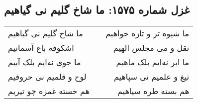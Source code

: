 \begin{center}
\section*{غزل شماره ۱۵۷۵: ما شاخ گلیم نی گیاهیم}
\label{sec:1575}
\begin{longtable}{l p{0.5cm} r}
ما شاخ گلیم نی گیاهیم
&&
ما شیوه تر و تازه خواهیم
\\
اشکوفه باغ آسمانیم
&&
نقل و می مجلس الهیم
\\
ما جوی نه‌ایم بلک آبیم
&&
ما ابر نه‌ایم بلک ماهیم
\\
لوح و قلمیم نی حروفیم
&&
تیغ و علمیم نی سپاهیم
\\
هم خسته غمزه چو تیریم
&&
هم بسته طره سیاهیم
\\
\end{longtable}
\end{center}
